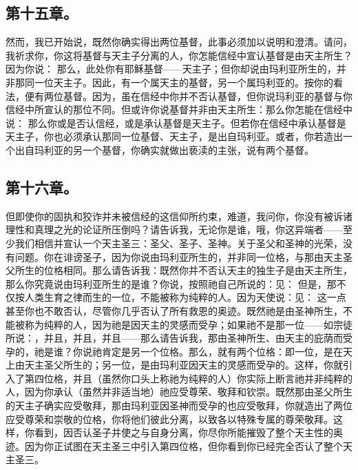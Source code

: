 
\subsection{第十五章。}

\par

然而，我已开始说，既然你确实得出两位基督，此事必须加以说明和澄清。请问，我祈求你，你这将基督与天主子分离的人，你怎能信经中宣认基督是由天主所生？因为你说： 那么，此处你有耶稣基督——天主子；但你却说由玛利亚所生的，并非那同一位天主子。因此，有一个属天主的基督，另一个属玛利亚的。按你的看法，便有两位基督。因为，虽在信经中你并不否认基督，但你说玛利亚的基督与你信经中所宣认的那位不同。但或许你说基督并非由天主所生：那么你怎能在信经中说： 那么你或是否认信经，或是承认基督是天主子。但若你在信经中承认基督是天主子，你也必须承认那同一位基督、天主子，是出自玛利亚。或者，你若造出一个出自玛利亚的另一个基督，你确实就做出亵渎的主张，说有两个基督。\par


\subsection{第十六章。}

\par

但即使你的固执和狡诈并未被信经的这信仰所约束，难道，我问你，你没有被诉诸理性和真理之光的论证所压倒吗？请告诉我，无论你是谁，哦，你这异端者——至少我们相信并宣认一个天主圣三：圣父、圣子、圣神。关于圣父和圣神的光荣，没有问题。你在诽谤圣子，因为你说由玛利亚所生的，并非同一位格，与那由天主圣父所生的位格相同。那么请告诉我：既然你并不否认天主的独生子是由天主所生，那么你究竟说由玛利亚所生的是谁？你说，按照祂自己所说的：见： 但是，那不仅按人类生育之律而生的一位，不能被称为纯粹的人。因为天使说：见： 这一点甚至你也不敢否认，尽管你几乎否认了所有救恩的奥迹。既然祂是由圣神所生，不能被称为纯粹的人，因为祂是因天主的灵感而受孕；如果祂不是那一位——如宗徒所说：，并且，并且，并且——那么请告诉我，那由圣神所生、由天主的庇荫而受孕的，祂是谁？你说祂肯定是另一个位格。那么，就有两个位格：即一位，是在天上由天主圣父所生的；另一位，是由玛利亚因天主的灵感而受孕的。这样，你就引入了第四位格，并且（虽然你口头上称祂为纯粹的人）你实际上断言祂并非纯粹的人，因为你承认（虽然并非适当地）祂应受尊荣、敬拜和钦崇。既然那由圣父所生的天主子确实应受敬拜，那由玛利亚因圣神而受孕的也应受敬拜，你就造出了两位应受尊荣和崇敬的位格，你将他们彼此分离，以致各以特殊专属的尊荣敬拜。这样，你看到，因否认圣子并使之与自身分离，你尽你所能摧毁了整个天主性的奥迹。因为你正试图在天主圣三中引入第四位格，但你看到你已经完全否认了整个天主圣三。\par

